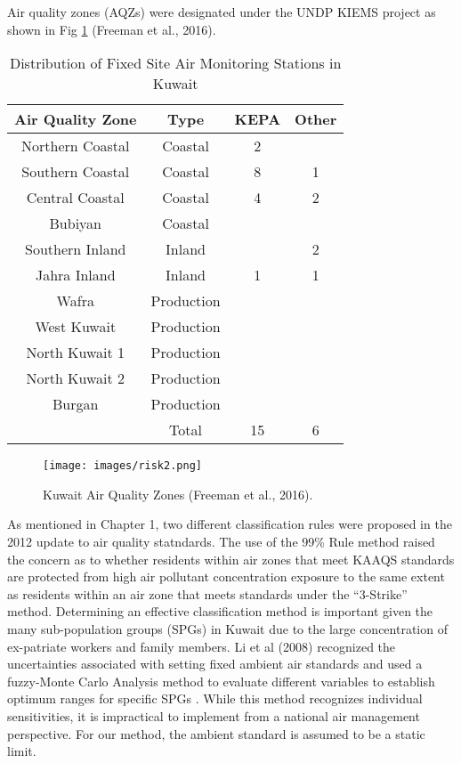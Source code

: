 Air quality zones (AQZs) were designated under the UNDP KIEMS project as shown in Fig \ref{fig2:aqzkuwait} (Freeman et al., 2016).
%
\begin{table}[H]
\centering
\caption{Distribution of Fixed Site Air Monitoring Stations in Kuwait}
\label{tb:2ams}
\begin{tabular}{@{}cccc@{}}
\toprule
\textbf{Air Quality Zone} & \textbf{Type} & \textbf{KEPA} & \textbf{Other} \\ \midrule
Northern Coastal & Coastal & 2 &  \\
Southern Coastal & Coastal & 8 & 1 \\
Central Coastal & Coastal & 4 & 2 \\
Bubiyan & Coastal &  &  \\
Southern Inland & Inland &  & 2 \\
Jahra Inland & Inland & 1 & 1 \\
Wafra & Production &  &  \\
West Kuwait & Production &  &  \\
North Kuwait 1 & Production &  &  \\
North Kuwait 2 & Production &  &  \\
Burgan & Production &  &  \\
 & Total & 15 & 6 \\ \bottomrule
\end{tabular}
\end{table}

%  
\begin{figure}[H]
\texttt{[image: images/risk2.png]} 
\caption[Kuwait Air Quality Zones]{Kuwait Air Quality Zones (Freeman et al., 2016).}
\label{fig2:aqzkuwait}
\end{figure}

As mentioned in Chapter 1, two different classification rules were proposed in the 2012 update to air quality statndards. The use of the 99\% Rule method raised the concern as to whether residents within air zones that meet KAAQS standards are protected from high air pollutant concentration exposure to the same extent as residents within an air zone that meets standards under the ``3-Strike” method. Determining an effective classification method is important given the many sub-population groups (SPGs) in Kuwait due to the large concentration of ex-patriate workers and family members. Li et al (2008) recognized the uncertainties associated with setting fixed ambient air standards and used a fuzzy-Monte Carlo Analysis method to evaluate different variables to establish optimum ranges for specific SPGs \citep{Li2008}. While this method recognizes individual sensitivities, it is impractical to implement from a national air management perspective. For our method, the ambient standard is assumed to be a static limit.

